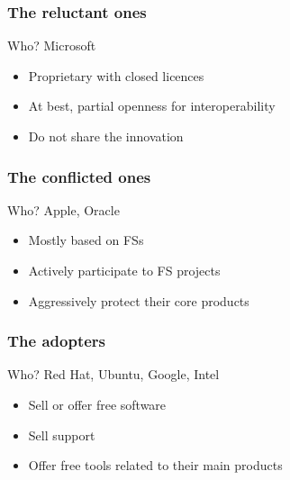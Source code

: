 \documentclass{beamer}
\begin{document}
\begin{frame}

  \frametitle{The reluctant ones}

  \begin{block}{Who?}
    Microsoft
  \end{block}

  \vfill

  \begin{itemize}
    \item{Proprietary with closed licences}
    \item{At best, partial openness for interoperability}
    \item{Do not share the innovation}
  \end{itemize}

\end{frame}

\begin{frame}

  \frametitle{The conflicted ones}

  \begin{block}{Who?}
    Apple, Oracle
  \end{block}

  \vfill

  \begin{itemize}
    \item{Mostly based on FSs}
    \item{Actively participate to FS projects}
    \item{Aggressively protect their core products}
  \end{itemize}

\end{frame}

\begin{frame}

  \frametitle{The adopters}

  \begin{block}{Who?}
    Red Hat, Ubuntu, Google, Intel
  \end{block}

  \vfill

  \begin{itemize}
    \item{Sell or offer free software}
    \item{Sell support}
    \item{Offer free tools related to their main products}
  \end{itemize}

\end{frame}
\end{document}
